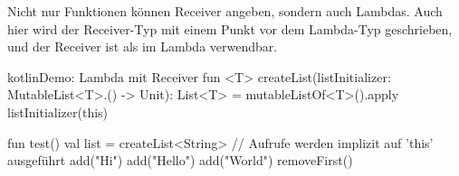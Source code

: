 Nicht nur Funktionen können Receiver angeben, sondern auch Lambdas.
Auch hier wird der Receiver-Typ mit einem Punkt vor dem Lambda-Typ geschrieben, und der Receiver ist als
 im Lambda verwendbar.

\begin{codeBlock}{kotlin}{Demo: Lambda mit Receiver}
fun <T> createList(listInitializer: MutableList<T>.() -> Unit): List<T> =
    mutableListOf<T>().apply { listInitializer(this) }

fun test() {
    val list = createList<String> {
        // Aufrufe werden implizit auf 'this' ausgeführt
        add("Hi")
        add("Hello")
        add("World")
        removeFirst()
    }
}
\end{codeBlock}

\renewcommand{\kapitelautor}{}
